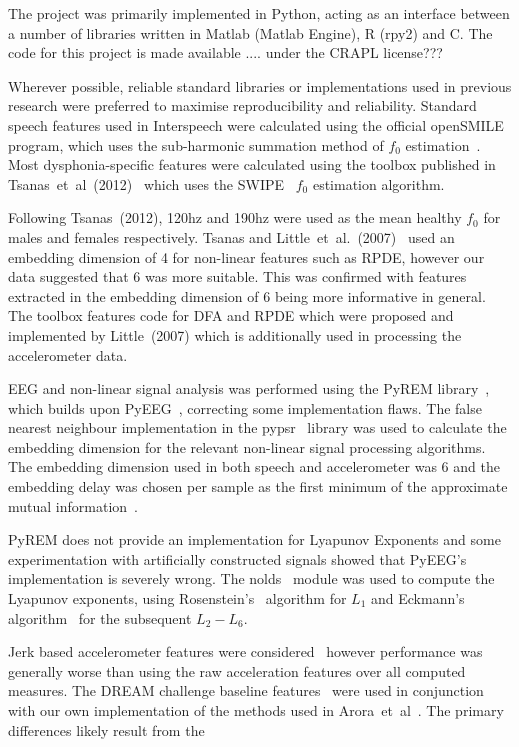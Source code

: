 \documentclass[12pt, twoside]{book}
\begin{document}
The project was primarily implemented in Python, acting as an interface between a number of libraries written in Matlab (Matlab Engine), R (rpy2) and C. The code for this project is made available .... under the CRAPL license???

Wherever possible, reliable standard libraries or implementations used in previous research were preferred to maximise reproducibility and reliability. Standard speech features used in Interspeech were calculated using the official openSMILE~\cite{opensmile} program, which uses the sub-harmonic summation method of $f_0$ estimation~\cite{shs}. Most dysphonia-specific features were calculated using the toolbox published in Tsanas~et~al~(2012)~\cite{spoverview} which uses the SWIPE~\cite{camacho2007swipe,f0estimation} $f_0$ estimation algorithm. 

Following Tsanas~(2012), 120hz and 190hz were used as the mean healthy $f_0$ for males and females respectively. Tsanas and Little~et~al.~(2007)~\cite{splittlenonlinear2007} used an embedding dimension of 4 for non-linear features such as RPDE, however our data suggested that 6 was more suitable. This was confirmed with features extracted in the embedding dimension of 6 being more informative in general. The toolbox features code for DFA and RPDE which were proposed and implemented by Little~(2007) which is additionally used in processing the accelerometer data.

EEG and non-linear signal analysis was performed using the PyREM library~\cite{pyrem}, which builds upon PyEEG~\cite{pyeeg}, correcting some implementation flaws. The false nearest neighbour implementation in the pypsr~\cite{pypsr} library was used to calculate the embedding dimension for the relevant non-linear signal processing algorithms. The embedding dimension used in both speech and accelerometer was 6 and the embedding delay was chosen per sample as the first minimum of the approximate mutual information~\cite{rosenstein1993practicallyapunov}.
 
PyREM does not provide an implementation for Lyapunov Exponents and some experimentation with artificially constructed signals showed that PyEEG's implementation is severely wrong. The nolds~\cite{nolds} module was used to compute the Lyapunov exponents, using Rosenstein's~\cite{rosenstein1993practicallyapunov} algorithm for $L_1$ and Eckmann's algorithm~\cite{eckmann1986liapunov} for the subsequent $L_2 - L_6$.
  
Jerk based accelerometer features were considered~\cite{jerkfeature} however performance was generally worse than using the raw acceleration features over all computed measures. The DREAM challenge baseline features~\cite{mpowertools} were used in conjunction with our own implementation of the methods used in Arora~et~al~\cite{arora2014high}. The primary differences likely result from the 
\end{document}
